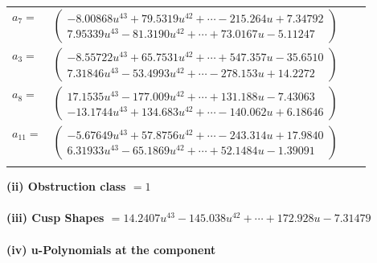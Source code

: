 \documentclass[1p]{elsarticle_modified}
\theoremstyle{definition}
\begin{document}
\begin{tabular}{m{7pt} m{180pt} m{7pt} m{180pt} }
\flushright $a_{7}=$&$\begin{pmatrix}-8.00868 u^{43}+79.5319 u^{42}+\cdots-215.264 u+7.34792\\7.95339 u^{43}-81.3190 u^{42}+\cdots+73.0167 u-5.11247\end{pmatrix}$ \\
\flushright $a_{3}=$&$\begin{pmatrix}-8.55722 u^{43}+65.7531 u^{42}+\cdots+547.357 u-35.6510\\7.31846 u^{43}-53.4993 u^{42}+\cdots-278.153 u+14.2272\end{pmatrix}$ \\
\flushright $a_{8}=$&$\begin{pmatrix}17.1535 u^{43}-177.009 u^{42}+\cdots+131.188 u-7.43063\\-13.1744 u^{43}+134.683 u^{42}+\cdots-140.062 u+6.18646\end{pmatrix}$ \\
\flushright $a_{11}=$&$\begin{pmatrix}-5.67649 u^{43}+57.8756 u^{42}+\cdots-243.314 u+17.9840\\6.31933 u^{43}-65.1869 u^{42}+\cdots+52.1484 u-1.39091\end{pmatrix}$\\&\end{tabular}
\flushleft \textbf{(ii) Obstruction class $= 1$}\\~\\
\flushleft \textbf{(iii) Cusp Shapes $= 14.2407 u^{43}-145.038 u^{42}+\cdots+172.928 u-7.31479$}\\~\\
\newpage\renewcommand{\arraystretch}{1}
\flushleft \textbf{(iv) u-Polynomials at the component}\newline \\
\end{document}
